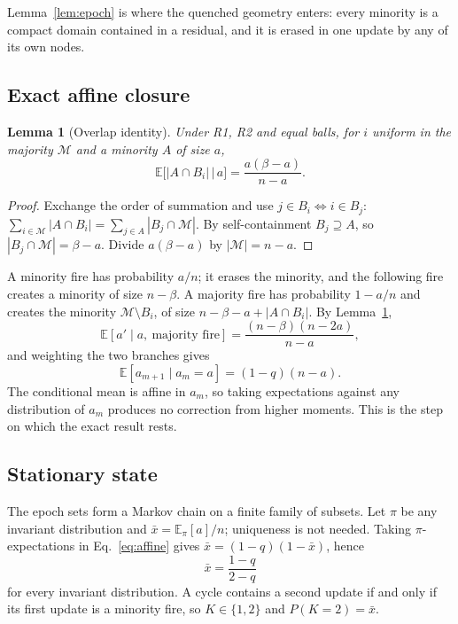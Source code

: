 \documentclass[aps,pre,reprint,superscriptaddress,amsmath,amssymb,longbibliography]{revtex4-2}
\newtheorem{lemma}{Lemma}
\theoremstyle{remark}
\newcommand{\E}{\mathbb{E}}
\begin{document}
Lemma~\ref{lem:epoch} is where the quenched geometry enters: every
minority is a compact domain contained in a residual, and it is erased
in one update by any of its own nodes.

\subsection{Exact affine closure}

\begin{lemma}[Overlap identity]
\label{lem:overlap}
Under R1, R2 and equal balls, for $i$ uniform in the majority $\mathcal
M$ and a minority $A$ of size $a$,
\begin{equation}
\E\big[|A\cap B_i|\,\big|\,a\big]=\frac{a(\beta-a)}{n-a}.
\label{eq:overlap}
\end{equation}
\end{lemma}

\begin{proof}
Exchange the order of summation and use $j\in B_i\iff i\in B_j$:
$\sum_{i\in\mathcal M}|A\cap B_i|=\sum_{j\in A}|B_j\cap\mathcal M|$. By
self-containment $B_j\supseteq A$, so $|B_j\cap\mathcal M|=\beta-a$.
Divide $a(\beta-a)$ by $|\mathcal M|=n-a$.
\end{proof}

A minority fire has probability $a/n$; it erases the minority, and the
following fire creates a minority of size $n-\beta$. A majority fire has
probability $1-a/n$ and creates the minority $\mathcal M\setminus B_i$,
of size $n-\beta-a+|A\cap B_i|$. By Lemma~\ref{lem:overlap},
\begin{equation}
\E[a'\mid a,\ \text{majority fire}]=\frac{(n-\beta)(n-2a)}{n-a},
\label{eq:branch}
\end{equation}
and weighting the two branches gives
\begin{equation}
\E[a_{m+1}\mid a_m=a]=(1-q)(n-a).
\label{eq:affine}
\end{equation}
The conditional mean is affine in $a_m$, so taking expectations against
any distribution of $a_m$ produces no correction from higher moments.
This is the step on which the exact result rests.

\subsection{Stationary state}

The epoch sets form a Markov chain on a finite family of subsets. Let
$\pi$ be any invariant distribution and $\bar x=\E_\pi[a]/n$; uniqueness
is not needed. Taking $\pi$-expectations in Eq.~\eqref{eq:affine} gives
$\bar x=(1-q)(1-\bar x)$, hence
\begin{equation}
\bar x=\frac{1-q}{2-q}
\label{eq:xbar}
\end{equation}
for every invariant distribution. A cycle contains a second update if
and only if its first update is a minority fire, so $K\in\{1,2\}$ and
$P(K=2)=\bar x$.
\end{document}
